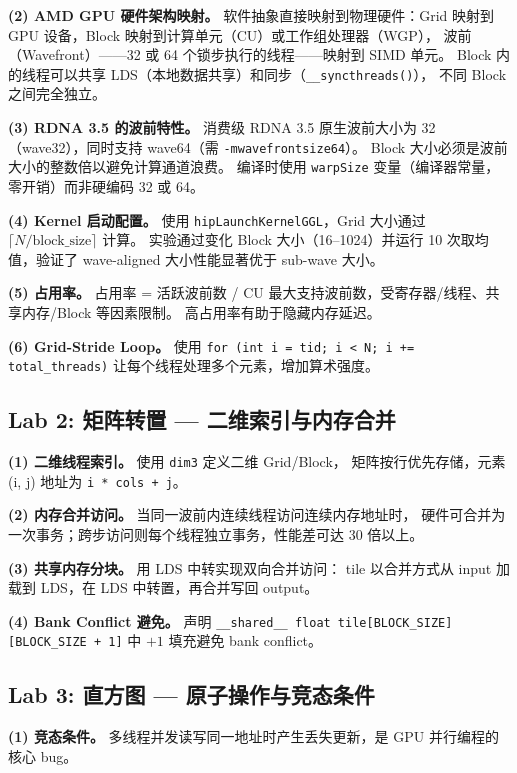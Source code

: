 \documentclass[UTF8,a4paper,10pt]{ctexart}
\begin{document}
\textbf{(2) AMD GPU 硬件架构映射。}
软件抽象直接映射到物理硬件：Grid 映射到 GPU 设备，Block 映射到计算单元（CU）或工作组处理器（WGP），
波前（Wavefront）——32 或 64 个锁步执行的线程——映射到 SIMD 单元。
Block 内的线程可以共享 LDS（本地数据共享）和同步（\texttt{\_\_syncthreads()}），
不同 Block 之间完全独立。

\textbf{(3) RDNA 3.5 的波前特性。}
消费级 RDNA 3.5 原生波前大小为 32（wave32），同时支持 wave64（需 \texttt{-mwavefrontsize64}）。
Block 大小必须是波前大小的整数倍以避免计算通道浪费。
编译时使用 \texttt{warpSize} 变量（编译器常量，零开销）而非硬编码 32 或 64。

\textbf{(4) Kernel 启动配置。}
使用 \texttt{hipLaunchKernelGGL}，Grid 大小通过 $\lceil N / \text{block\_size} \rceil$ 计算。
实验通过变化 Block 大小（16--1024）并运行 10 次取均值，验证了 wave-aligned 大小性能显著优于 sub-wave 大小。

\textbf{(5) 占用率。}
占用率 = 活跃波前数 / CU 最大支持波前数，受寄存器/线程、共享内存/Block 等因素限制。
高占用率有助于隐藏内存延迟。

\textbf{(6) Grid-Stride Loop。}
使用 \texttt{for (int i = tid; i < N; i += total\_threads)} 让每个线程处理多个元素，增加算术强度。

\subsection{Lab 2: 矩阵转置 — 二维索引与内存合并}

\textbf{(1) 二维线程索引。} 使用 \texttt{dim3} 定义二维 Grid/Block，
矩阵按行优先存储，元素 (i, j) 地址为 \texttt{i * cols + j}。

\textbf{(2) 内存合并访问。} 当同一波前内连续线程访问连续内存地址时，
硬件可合并为一次事务；跨步访问则每个线程独立事务，性能差可达 30 倍以上。

\textbf{(3) 共享内存分块。} 用 LDS 中转实现双向合并访问：
tile 以合并方式从 input 加载到 LDS，在 LDS 中转置，再合并写回 output。

\textbf{(4) Bank Conflict 避免。}
声明 \texttt{\_\_shared\_\_ float tile[BLOCK\_SIZE][BLOCK\_SIZE + 1]} 中 $+1$ 填充避免 bank conflict。

\subsection{Lab 3: 直方图 — 原子操作与竞态条件}

\textbf{(1) 竞态条件。} 多线程并发读写同一地址时产生丢失更新，是 GPU 并行编程的核心 bug。
\end{document}

